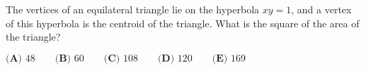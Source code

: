 The vertices of an equilateral triangle lie on the hyperbola $xy=1$, and a vertex of this hyperbola is the centroid of the triangle. What is the square of the area of the triangle?

$\textbf{(A) }48\qquad\textbf{(B) }60\qquad\textbf{(C) }108\qquad\textbf{(D) }120\qquad\textbf{(E) }169$
